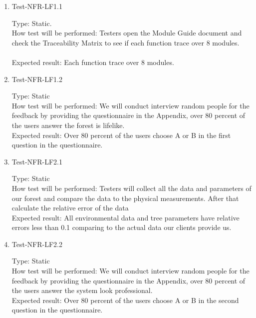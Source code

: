 \documentclass[12pt, titlepage]{article}
\begin{document}
\begin{enumerate}

\item{Test-NFR-LF1.1\\}

Type: Static.\\
How test will be performed: Testers open the Module Guide document and check the Traceability Matrix to see if each function trace over 8 modules.\\\\
Expected result: Each function trace over 8 modules.					
\item{Test-NFR-LF1.2\\}

Type: Static\\

How test will be performed: We will conduct interview random people for the feedback by providing the questionnaire in the Appendix, over 80 percent of the users answer the forest is lifelike.\\

Expected result: Over 80 percent of the users choose A or B in the first question in the questionnaire.

\item{Test-NFR-LF2.1\\}

Type: Static\\

How test will be performed: Testers will collect all the data and parameters of our forest and compare the data to the physical measurements. After that calculate the relative error of the data\\

Expected result: All environmental data and tree parameters have relative errors less than 0.1 comparing to the actual data our clients provide us.

\item{Test-NFR-LF2.2\\}

Type: Static\\

How test will be performed: We will conduct interview random people for the feedback by providing the questionnaire in the Appendix, over 80 percent of the users answer the system look professional.\\

Expected result: Over 80 percent of the users choose A or B in the second question in the questionnaire.


\end{enumerate}
\end{document}
